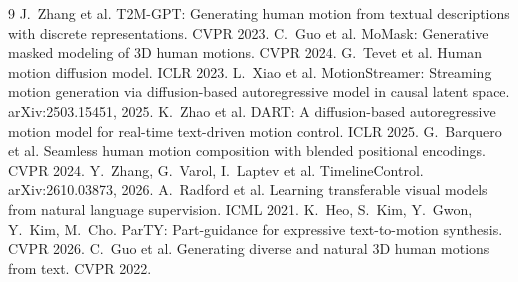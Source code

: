 \documentclass[11pt]{article}
\begin{document}
\begin{thebibliography}{9}
 J.~Zhang et al. T2M-GPT: Generating human motion from textual descriptions with discrete representations. CVPR 2023.
 C.~Guo et al. MoMask: Generative masked modeling of 3D human motions. CVPR 2024.
 G.~Tevet et al. Human motion diffusion model. ICLR 2023.
 L.~Xiao et al. MotionStreamer: Streaming motion generation via diffusion-based autoregressive model in causal latent space. arXiv:2503.15451, 2025.
 K.~Zhao et al. DART: A diffusion-based autoregressive motion model for real-time text-driven motion control. ICLR 2025.
 G.~Barquero et al. Seamless human motion composition with blended positional encodings. CVPR 2024.
 Y.~Zhang, G.~Varol, I.~Laptev et al. TimelineControl. arXiv:2610.03873, 2026.
 A.~Radford et al. Learning transferable visual models from natural language supervision. ICML 2021.
 K.~Heo, S.~Kim, Y.~Gwon, Y.~Kim, M.~Cho. ParTY: Part-guidance for expressive text-to-motion synthesis. CVPR 2026.
 C.~Guo et al. Generating diverse and natural 3D human motions from text. CVPR 2022.
\end{thebibliography}
\end{document}

